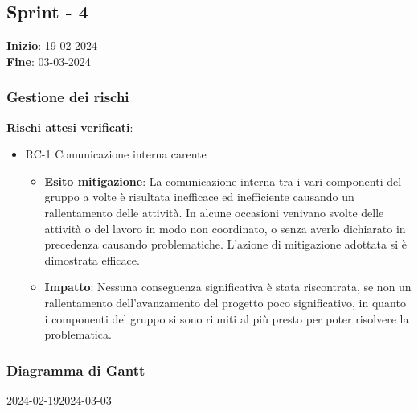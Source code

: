 \subsection{Sprint - 4}

\textbf{Inizio}: 19-02-2024 \\
\textbf{Fine}: 03-03-2024

\subsubsection{Gestione dei rischi}
\textbf{Rischi attesi verificati}:

\begin{itemize}
	\item RC-1 Comunicazione interna carente
	      \begin{itemize}
		      \item \textbf{Esito mitigazione}: La comunicazione interna tra i vari componenti del gruppo a volte è risultata inefficace ed inefficiente causando un rallentamento delle attività.
		            In alcune occasioni venivano svolte delle attività o del lavoro in modo non coordinato, o senza averlo dichiarato in precedenza causando problematiche.
		            L'azione di mitigazione adottata si è dimostrata efficace.
		      \item \textbf{Impatto}: Nessuna conseguenza significativa è stata
		            riscontrata, se non un rallentamento dell'avanzamento del progetto poco significativo, in quanto
		            i componenti del gruppo si sono riuniti al più presto per poter risolvere la problematica.
	      \end{itemize}
\end{itemize}

\subsubsection{Diagramma di Gantt}

\begin{ganttchart}[
		x unit=0.6cm, %
		y unit chart=0.6cm,
		bar/.style={fill=blue!50},
		bar height=0.5,
		time slot format=isodate,
		time slot unit=day,
		vgrid,
		today=2024-02-19,
		today rule/.style={draw=red, ultra thick}
	]{2024-02-19}{2024-03-03}
	 \\
	 \\
	 \\
	 \\
	 \\
\end{ganttchart}

